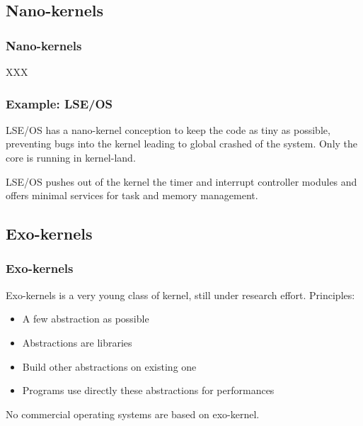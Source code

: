 %
%

\subsection{Nano-kernels}

%
%

\begin{frame}
  \frametitle{Nano-kernels}

  XXX

\end{frame}

%
%

\begin{frame}
  \frametitle{Example: LSE/OS}

  LSE/OS has a nano-kernel conception to keep the code as tiny as
  possible, preventing bugs into the kernel leading to global crashed
  of the system. Only the core is running in kernel-land.

  \begin{center}
  \end{center}

  LSE/OS pushes out of the kernel the timer and interrupt controller
  modules and offers minimal services for task and memory management.

\end{frame}

%
%

\subsection{Exo-kernels}

%
%

\begin{frame}
  \frametitle{Exo-kernels}

  Exo-kernels is a very young class of kernel, still under research
  effort. Principles:

  \begin{itemize}
  \item
    A few abstraction as possible
  \item
    Abstractions are libraries
  \item
    Build other abstractions on existing one
  \item
    Programs use directly these abstractions for performances
  \end{itemize}

  \-

  No commercial operating systems are based on exo-kernel.

\end{frame}


